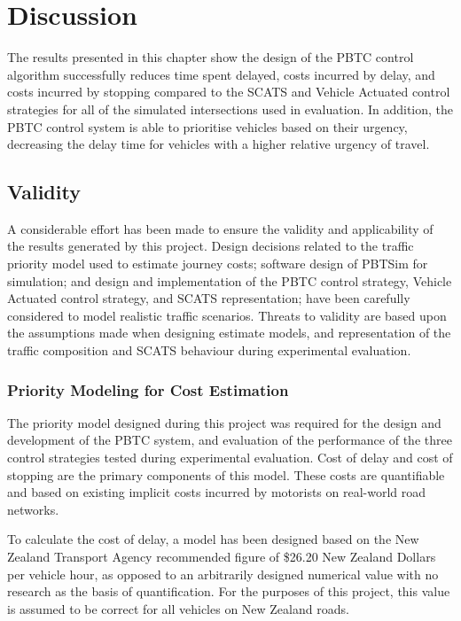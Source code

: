 {\section{Discussion}

The results presented in this chapter show the design of the PBTC control algorithm successfully reduces time spent delayed, costs incurred by delay, and costs incurred by stopping compared to the SCATS and Vehicle Actuated control strategies for all of the simulated intersections used in evaluation. In addition, the PBTC control system is able to prioritise vehicles based on their urgency, decreasing the delay time for vehicles with a higher relative urgency of travel.

\subsection{Validity}

A considerable effort has been made to ensure the validity and applicability of the results generated by this project. Design decisions related to the traffic priority model used to estimate journey costs; software design of PBTSim for simulation; and design and implementation of the PBTC control strategy, Vehicle Actuated control strategy, and SCATS representation; have been carefully considered to model realistic traffic scenarios. Threats to validity are based upon the assumptions made when designing estimate models, and representation of the traffic composition and SCATS behaviour during experimental evaluation.

\subsubsection{Priority Modeling for Cost Estimation}

The priority model designed during this project was required for the design and development of the PBTC system, and evaluation of the performance of the three control strategies tested during experimental evaluation. Cost of delay and cost of stopping are the primary components of this model. These costs are quantifiable and based on existing implicit costs incurred by motorists on real-world road networks. 

To calculate the cost of delay, a model has been designed based on the New Zealand Transport Agency recommended figure of \$26.20 New Zealand Dollars per vehicle hour, as opposed to an arbitrarily designed numerical value with no research as the basis of quantification. For the purposes of this project, this value is assumed to be correct for all vehicles on New Zealand roads. 

}
